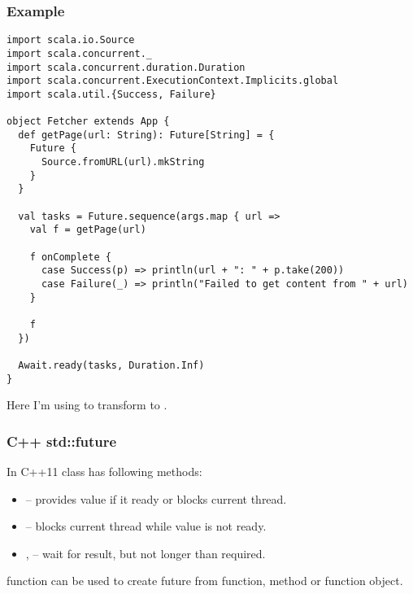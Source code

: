 \begin{frame}[fragile]
\frametitle{Example}
\begin{lstlisting}
import scala.io.Source
import scala.concurrent._
import scala.concurrent.duration.Duration
import scala.concurrent.ExecutionContext.Implicits.global
import scala.util.{Success, Failure}

object Fetcher extends App {
  def getPage(url: String): Future[String] = {
    Future {
      Source.fromURL(url).mkString
    }
  }

  val tasks = Future.sequence(args.map { url =>
    val f = getPage(url)

    f onComplete {
      case Success(p) => println(url + ": " + p.take(200))
      case Failure(_) => println("Failed to get content from " + url)
    }

    f
  })

  Await.ready(tasks, Duration.Inf)
}
\end{lstlisting}

Here I'm using  to transform  to
.
\end{frame}

\begin{frame}[fragile]
\frametitle{C++ std::future}
In C++11  class has following methods:
\begin{itemize}
\item {} -- provides value if it ready or blocks current thread.
\item {} -- blocks current thread while value is not ready.
\item {},  -- wait for result, but not longer than
required.
\end{itemize}
 function can be used to create future from function, method or function object.
\end{frame}

